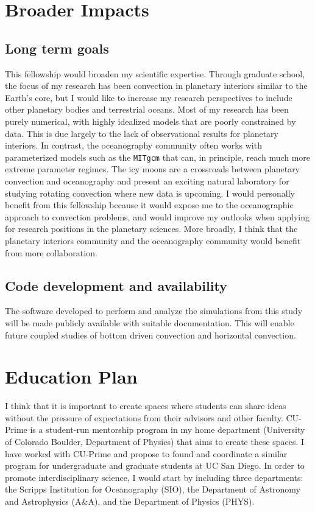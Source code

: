 \documentclass[12pt]{article}
\begin{document}
\section{Broader Impacts}

\subsection{Long term goals}
This fellowship would broaden my scientific expertise. Through graduate school,
the focus of my research has been convection in planetary interiors similar to the Earth's core, but I would like to increase my research perspectives to include other planetary bodies and terrestrial oceans. Most of my research has been purely numerical, with highly idealized models that are poorly constrained by data. This is due largely to the lack of observational results for planetary interiors. In contrast, the oceanography community often works with parameterized models such as the \texttt{MITgcm}\citep{jM97} that can, in principle, reach much more extreme parameter regimes. The icy moons are a crossroads between planetary convection and oceanography and present an exciting natural laboratory for studying rotating convection where new data is upcoming. I would personally benefit from this fellowship because it would expose me to the oceanographic approach to convection problems, and would improve my outlooks when applying for research positions in the planetary sciences. More broadly, I think that the planetary interiors community and the oceanography community would benefit from more collaboration. 

\subsection{Code development and availability}
The software developed to perform and analyze the simulations from this study will be made publicly available with suitable documentation. This will enable future coupled studies of bottom driven convection and horizontal convection.
%
\section{Education Plan}
I think that it is important to create spaces where students can share ideas without the pressure of expectations from their advisors and other faculty.
CU-Prime\citep{cup} is a student-run mentorship program in my home department (University of Colorado Boulder, Department of Physics) that aims to create these spaces. 
I have worked with CU-Prime and propose to found and coordinate a similar program for undergraduate and graduate students at UC San Diego. In order to promote interdisciplinary science, I would start by including three departments: the Scripps Institution for Oceanography (SIO), the Department of Astronomy and Astrophysics (A\&A), and the Department of Physics (PHYS). 
\end{document}
